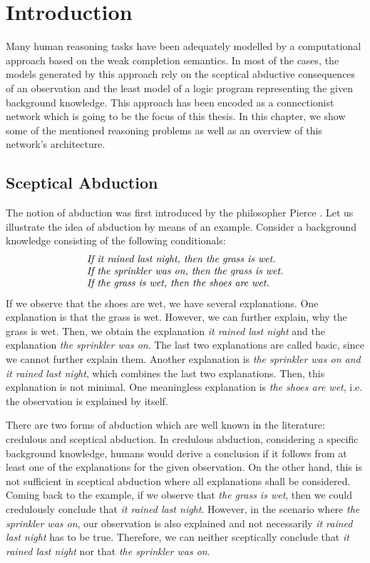 
\chapter{Introduction}
\label{sec:intro}

Many human reasoning tasks have been adequately modelled by a computational approach based on the weak completion semantics. In most of the cases, the models generated by this approach rely on the sceptical abductive consequences of an observation and the least model of a logic program representing the given background knowledge. This approach has been encoded as a connectionist network which is going to be the focus of this thesis. In this chapter, we show some of the mentioned reasoning problems as well as an overview of this network's architecture. 

\section{Sceptical Abduction}

The notion of abduction was first introduced by the philosopher Pierce \cite{quine1933collected}. Let us illustrate the idea of abduction by means of an example. Consider a background knowledge consisting of the following conditionals:
\[
\begin{array}{l}
\mbox{\textit{If it rained last night, then the grass is wet.}}\\
\mbox{\textit{If the sprinkler was on, then the grass is wet.}}\\
\mbox{\textit{If the grass is wet, then the shoes are wet.}}\\
\end{array}
\]
If we observe that the shoes are wet, we have several explanations. One explanation is that the grass is wet. However, we can further explain, why the grass is wet. Then, we obtain the explanation \textit{it rained last night} and the explanation \textit{the sprinkler was on}. The last two explanations are called basic, since we cannot further explain them. Another explanation is \textit{the sprinkler was on and it rained last night}, which combines the last two explanations. Then, this explanation is not minimal. One meaningless explanation is \textit{the shoes are wet}, i.e. the observation is explained by itself.

There are two forms of abduction which are well known in the literature: credulous and sceptical abduction. In credulous abduction, considering a specific background knowledge, humans would derive a conclusion if it follows from at least one of the explanations for the given observation. On the other hand, this is not sufficient in sceptical abduction where all explanations shall be considered. Coming back to the example, if we observe that \textit{the grass is wet}, then we could credulously conclude that \textit{it rained last night}. However, in the scenario where \textit{the sprinkler was on}, our observation is also explained and not necessarily \textit{it rained last night} has to be true. Therefore, we can neither sceptically conclude that \textit{it rained last night} nor that \textit{the sprinkler was on}.


